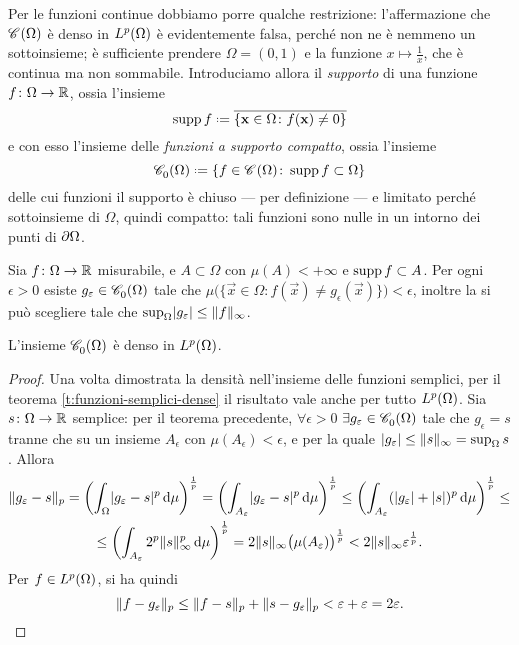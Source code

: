 Per le funzioni continue dobbiamo porre qualche restrizione: l'affermazione che $\cont{\Omega}$ è denso in $\leb[p]{\Omega}$ è evidentemente falsa, perch\'e non ne è nemmeno un sottoinsieme; è sufficiente prendere $\Omega=(0,1)$ e la funzione $x\mapsto\frac1{x}$, che è continua ma non sommabile.
Introduciamo allora il \emph{supporto} di una funzione $f\colon\Omega\to\R$, ossia l'insieme
\begin{equation*}
    \supp f\defeq\clos{\{\vec x\in\Omega\colon f(\vec x)\ne 0\}}
\end{equation*}
e con esso l'insieme delle \emph{funzioni a supporto compatto}, ossia l'insieme
\begin{equation*}
    \contsc{\Omega}\defeq\{f\in\cont{\Omega}\colon \supp f\subset\Omega\}
    \label{d:funzioni-continue-supporto-compatto}
\end{equation*}
delle cui funzioni il supporto è chiuso --- per definizione --- e limitato perch\'e sottoinsieme di $\Omega$, quindi compatto: tali funzioni sono nulle in un intorno dei punti di $\boundary\Omega$.
\begin{teorema}[Lusin] \label{t:lusin}
    Sia $f\colon\Omega\to\R$ misurabile, e $A\subset\Omega$ con $\mu(A)<+\infty$ e $\supp f\subset A$.
    Per ogni $\epsilon>0$ esiste $g_\epsilon\in\contsc{\Omega}$ tale che $\mu\bigl(\{\vec x\in\Omega\colon f(\vec x)\ne g_\epsilon(\vec x)\}\bigr)<\epsilon$, inoltre la si può scegliere tale che $\sup_\Omega\abs{g_\epsilon}\le\norm{f}_{\infty}$.
\end{teorema}
\begin{teorema} \label{t:funzioni-continue-supporto-compatto-dense}
    L'insieme $\contsc{\Omega}$ è denso in $\leb[p]{\Omega}$.
\end{teorema}
\begin{proof}
    Una volta dimostrata la densità nell'insieme delle funzioni semplici, per il teorema \ref{t:funzioni-semplici-dense} il risultato vale anche per tutto $\leb[p]{\Omega}$.
    Sia $s\colon\Omega\to\R$ semplice: per il teorema precedente, $\forall\epsilon>0$ $\exists g_\epsilon\in\contsc{\Omega}$ tale che $g_\epsilon=s$ tranne che su un insieme $A_\epsilon$ con $\mu(A_\epsilon)<\epsilon$, e per la quale $\abs{g_\epsilon}\le\norm{s}_\infty=\sup_\Omega s$.
    Allora
    \begin{multline}
        \norm{g_\epsilon-s}_p=
        \biggl(\int_\Omega\abs{g_\epsilon-s}^p\,\dd\mu\biggr)^\frac1{p}=
        \biggl(\int_{A_\epsilon}\abs{g_\epsilon-s}^p\,\dd\mu\biggr)^\frac1{p}\le
        \biggl(\int_{A_\epsilon}(\abs{g_\epsilon}+\abs{s})^p\,\dd\mu\biggr)^\frac1{p}\le\\ \le
        \biggl(\int_{A_\epsilon}2^p\norm{s}_\infty^p\,\dd\mu\biggr)^\frac1{p}=
        2\norm{s}_\infty\bigl(\mu(A_\epsilon)\bigr)^\frac1{p}<
        2\norm{s}_\infty\epsilon^\frac1{p}.
    \end{multline}
    Per $f\in\leb[p]{\Omega}$, si ha quindi
    \begin{equation}
        \norm{f-g_\epsilon}_p\le
        \norm{f-s}_p+\norm{s-g_\epsilon}_p<
        \epsilon+\epsilon=
        2\epsilon.\qedhere
    \end{equation}
\end{proof}
